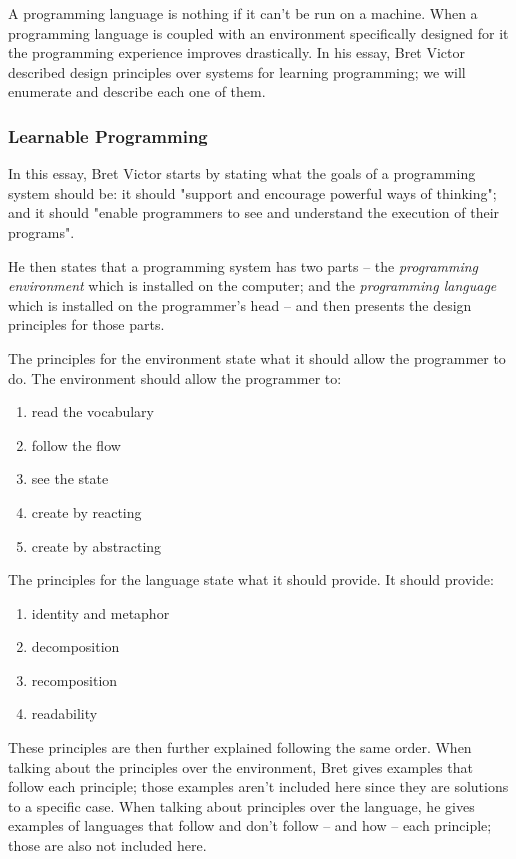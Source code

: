 \documentclass{./llncs2e/llncs}
\begin{document}
A programming language is nothing if it can't be run on a machine. When a programming language is coupled with an environment specifically designed for it the programming experience improves drastically. In his essay\cite{victor2012learnable}, Bret Victor described design principles over systems for learning programming; we will enumerate and describe each one of them.

\subsubsection{Learnable Programming\cite{victor2012learnable}}
In this essay, Bret Victor starts by stating what the goals of a programming system should be: it should "support and encourage powerful ways of thinking"; and it should "enable programmers to see and understand the execution of their programs".

He then states that a programming system has two parts -- the \emph{programming environment} which is installed on the computer; and the \emph{programming language} which is installed on the programmer's head -- and then presents the design principles for those parts.

The principles for the environment state what it should allow the programmer to do. The environment should allow the programmer to:
\begin{enumerate}
	\item \label{lp:env:read} read the vocabulary 
	\item \label{lp:env:flow} follow the flow
	\item \label{lp:env:state} see the state
	\item \label{lp:env:react} create by reacting
	\item \label{lp:env:abstr} create by abstracting
\end{enumerate}

The principles for the language state what it should provide. It should provide:
\begin{enumerate}
	\item \label{lp:lang:id} identity and metaphor
	\item \label{lp:lang:decom} decomposition
	\item \label{lp:lang:recom} recomposition
	\item \label{lp:lang:read} readability
\end{enumerate}

These principles are then further explained following the same order. When talking about the principles over the environment, Bret gives examples that follow each principle; those examples aren't included here since they are solutions to a specific case. When talking about principles over the language, he gives examples of languages that follow and don't follow -- and how -- each principle; those are also not included here.
\end{document}
